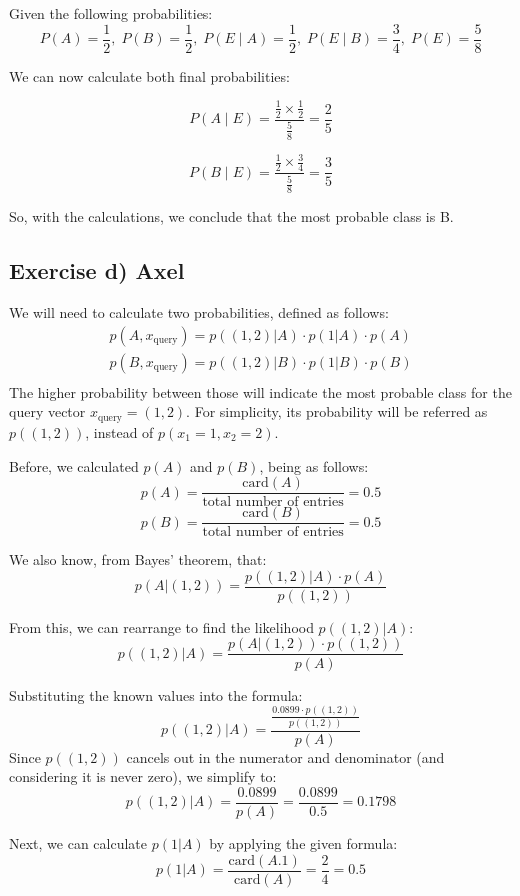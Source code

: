 \documentclass{article}
\begin{document}
Given the following probabilities:
\[
P(A) = \frac{1}{2},\;P(B) = \frac{1}{2},\;P(E \mid A ) = \frac{1}{2},\;P(E \mid B) = \frac{3}{4},\;P(E) = \frac{5}{8}
\]

We can now calculate both final probabilities:

\[P(A \mid E) = \frac{\frac{1}{2} \times \frac{1}{2}}{\frac{5}{8}} = \frac{2}{5}\]

\[P(B \mid E) = \frac{\frac{1}{2} \times \frac{3}{4}}{\frac{5}{8}} = \frac{3}{5}\]

So, with the calculations, we conclude that the most probable class is B.

\subsection{Exercise d) Axel}
We will need to calculate two probabilities, defined as follows:
\begin{align*}
    p(A, x_\text{query}) = p((1,2) | A) \cdot p(1 | A) \cdot p(A) \\
    p(B, x_\text{query}) = p((1,2) | B) \cdot p(1 | B) \cdot p(B) \\
\end{align*}
The higher probability between those will indicate the most probable class for the query vector \( x_\text{query} = (1,2) \). For simplicity, its probability will be referred as \(p((1,2))\), instead of \(p(x_1 = 1, x_2 = 2)\).

\bigskip

Before, we calculated \( p(A) \) and \( p(B) \), being as follows: 
\[
p(A) = \frac{\text{card}(A)}{\text{total number of entries}} = 0.5
\]
\[
p(B) = \frac{\text{card}(B)}{\text{total number of entries}} = 0.5
\]

\bigskip

We also know, from Bayes' theorem, that:
\[
p(A | (1,2)) = \frac{p((1,2) | A) \cdot p(A)}{p((1,2))}
\]

From this, we can rearrange to find the likelihood \( p((1,2) | A) \):
\[
p((1,2) | A) = \frac{p(A | (1,2)) \cdot p((1,2))}{p(A)}
\]

Substituting the known values into the formula:
\[
p((1,2) | A) = \frac{\frac{0.0899 \cdot p((1,2))}{p((1,2))}}{p(A)}
\]
Since \( p((1,2)) \) cancels out in the numerator and denominator (and considering it is never zero), we simplify to:
\[
p((1,2) | A) = \frac{0.0899}{p(A)} = \frac{0.0899}{0.5} = 0.1798
\]

Next, we can calculate \( p(1 | A) \) by applying the given formula:
\[
p(1 | A) = \frac{\text{card}(A.1)}{\text{card}(A)} = \frac{2}{4} = 0.5
\]
\end{document}
